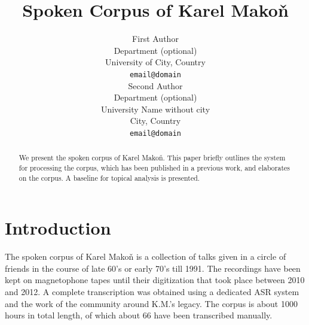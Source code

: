\documentclass[a4paper,11pt]{article}
\title{Spoken Corpus of Karel Mako\v{n}}
\author{First Author \\
  Department (optional)\\
  University of City, Country \\
  {\tt email@domain} \\\And %
  Second Author \\
  Department (optional)\\
  University Name without city \\
  City, Country \\
 {\tt email@domain} \\
}
\date{}
\begin{document}
\maketitle
\begin{abstract}
  We present the spoken corpus of Karel Mako\v{n}. This paper
  briefly outlines the system for processing the corpus, which has been
  published in a previous work, and elaborates on the corpus. A baseline for
  topical analysis is presented.
\end{abstract}

\section{Introduction} \label{intro}

%

The spoken corpus of Karel Mako\v{n} is a collection of talks given in a circle
of friends in the course of late 60's or early 70's till 1991. The recordings
have been kept on magnetophone tapes until their digitization that took place
between 2010 and 2012. A complete transcription was obtained using a dedicated
ASR system and the work of the community around K.M.'s legacy. The corpus is
about 1000 hours in total length, of which about 66 have been transcribed
manually.
\end{document}
